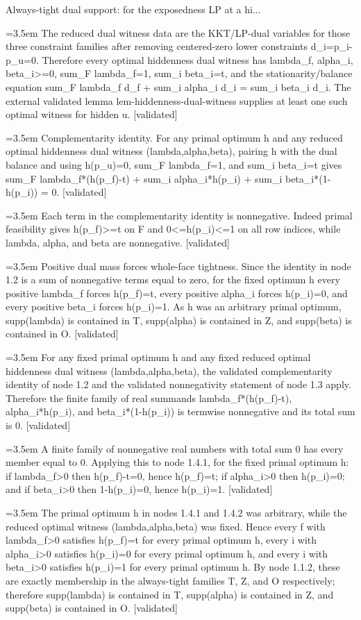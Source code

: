 \documentclass{article}
\newcommand{\step}[1]{\par\noindent\hangindent=3.5em\hangafter=1%
  \makebox[3.5em][l]{\textbf{#1.}}}
\newcommand{\steptag}[1]{\hfill{\small\textsf{[#1]}}}
\begin{document}
\begin{proofbox}{Always-tight dual support: for the exposedness LP at a hi...}
\step{1.1.3} The reduced dual witness data are the KKT/LP-dual variables for those three constraint families after removing centered-zero lower constraints d\_i=p\_i-p\_u=0. Therefore every optimal hiddenness dual witness has lambda\_f, alpha\_i, beta\_i>=0, sum\_F lambda\_f=1, sum\_i beta\_i=t, and the stationarity/balance equation sum\_F lambda\_f d\_f + sum\_i alpha\_i d\_i = sum\_i beta\_i d\_i. The external validated lemma lem-hiddenness-dual-witness supplies at least one such optimal witness for hidden u. \steptag{validated} \\[4pt]
\step{1.2} Complementarity identity. For any primal optimum h and any reduced optimal hiddenness dual witness (lambda,alpha,beta), pairing h with the dual balance and using h(p\_u)=0, sum\_F lambda\_f=1, and sum\_i beta\_i=t gives sum\_F lambda\_f*(h(p\_f)-t) + sum\_i alpha\_i*h(p\_i) + sum\_i beta\_i*(1-h(p\_i)) = 0. \steptag{validated} \\[4pt]
\step{1.3} Each term in the complementarity identity is nonnegative. Indeed primal feasibility gives h(p\_f)>=t on F and 0<=h(p\_i)<=1 on all row indices, while lambda, alpha, and beta are nonnegative. \steptag{validated} \\[4pt]
\step{1.4} Positive dual mass forces whole-face tightness. Since the identity in node 1.2 is a sum of nonnegative terms equal to zero, for the fixed optimum h every positive lambda\_f forces h(p\_f)=t, every positive alpha\_i forces h(p\_i)=0, and every positive beta\_i forces h(p\_i)=1. As h was an arbitrary primal optimum, supp(lambda) is contained in T, supp(alpha) is contained in Z, and supp(beta) is contained in O. \steptag{validated} \\[6pt]
\step{1.4.1} For any fixed primal optimum h and any fixed reduced optimal hiddenness dual witness (lambda,alpha,beta), the validated complementarity identity of node 1.2 and the validated nonnegativity statement of node 1.3 apply. Therefore the finite family of real summands lambda\_f*(h(p\_f)-t), alpha\_i*h(p\_i), and beta\_i*(1-h(p\_i)) is termwise nonnegative and its total sum is 0. \steptag{validated} \\[4pt]
\step{1.4.2} A finite family of nonnegative real numbers with total sum 0 has every member equal to 0. Applying this to node 1.4.1, for the fixed primal optimum h: if lambda\_f>0 then h(p\_f)-t=0, hence h(p\_f)=t; if alpha\_i>0 then h(p\_i)=0; and if beta\_i>0 then 1-h(p\_i)=0, hence h(p\_i)=1. \steptag{validated} \\[4pt]
\step{1.4.3} The primal optimum h in nodes 1.4.1 and 1.4.2 was arbitrary, while the reduced optimal witness (lambda,alpha,beta) was fixed. Hence every f with lambda\_f>0 satisfies h(p\_f)=t for every primal optimum h, every i with alpha\_i>0 satisfies h(p\_i)=0 for every primal optimum h, and every i with beta\_i>0 satisfies h(p\_i)=1 for every primal optimum h. By node 1.1.2, these are exactly membership in the always-tight families T, Z, and O respectively; therefore supp(lambda) is contained in T, supp(alpha) is contained in Z, and supp(beta) is contained in O. \steptag{validated} \\[4pt]

\end{proofbox}
\end{document}
